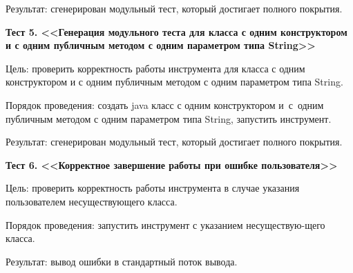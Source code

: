 Результат: сгенерирован модульный тест, который достигает полного покрытия.


\textbf{Тест 5. <<Генерация модульного теста для класса с одним конструктором и с одним публичным методом с одним параметром типа String>>}

Цель: проверить корректность работы инструмента для класса с одним конструктором и с одним публичным методом с одним параметром типа String.

Порядок проведения: создать java класс с одним конструктором и~с~одним публичным методом с одним параметром типа String, запустить инструмент.

Результат: сгенерирован модульный тест, который достигает полного покрытия.


\textbf{Тест 6. <<Корректное завершение работы при ошибке пользователя>>}

Цель: проверить корректность работы инструмента в случае указания пользователем несуществующего класса.

Порядок проведения: запустить инструмент с указанием несуществую-щего класса.

Результат: вывод ошибки в стандартный поток вывода.
